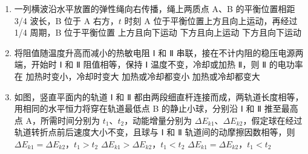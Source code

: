 \documentclass[\gkver]{gaokaozhenti}
\begin{document}
\begin{enumerate}
\item
一列横波沿水平放置的弹性绳向右传播，绳上两质点 A、B 的平衡位置相距 3/4 波长，B 位于 A 右方，$t$ 时刻 A 位于平衡位置上方且向上运动，再经过 1/4 周期，B 位于平衡位置
{上方且向下运动}
{下方且向上运动}
{下方且向下运动}

\item
将阻值随温度升高而减小的热敏电阻 Ⅰ 和 Ⅱ 串联，接在不计内阻的稳压电源两端，开始时 Ⅰ 和 Ⅱ 阻值相等，保持 Ⅰ 温度不变，冷却或加热 Ⅱ，则 Ⅱ 的电功率在
{加热时变小，冷却时变大}
{加热或冷却都变小}
{加热或冷却都变大}

\item
如图，竖直平面内的轨道 Ⅰ 和 Ⅱ 都由两段细直杆连接而成，两轨道长度相等，用相同的水平恒力将穿在轨道最低点 B 的静止小球，分别沿 Ⅰ 和 Ⅱ 推至最高点 A，所需时间分别为 $t_{1}$、$t_{2}$，动能增量分别为 $\Delta E_{k1}$、$\Delta E_{k2}$，假定球在经过轨道转折点前后速度大小不变，且球与 Ⅰ 和 Ⅱ 轨道间的动摩擦因数相等，则
\onepicture[align=right, w=4.38cm]{}
{$\Delta E_{k1} = \Delta E_{k2}$，$t_{1} > t_{2}$}
{$\Delta E_{k1} > \Delta E_{k2}$，$t_{1} < t_{2}$}
{$\Delta E_{k1} = \Delta E_{k2}$，$t_{1} < t_{2}$}


\end{enumerate}
\end{document}
